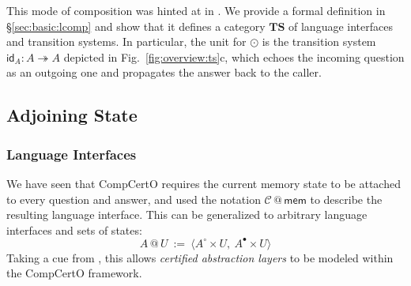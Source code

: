 \documentclass[acmsmall,screen,review,anonymous]{acmart}
\newcommand{\kw}[1]{\ensuremath{ \mathsf{#1} }}
\newcommand{\que}{\circ}
\newcommand{\ans}{\bullet}
\begin{document}
This mode of composition was hinted at in \citet{compcerto}.
We provide a formal definition in \S\ref{sec:basic:lcomp}
and show that
it defines a category $\mathbf{TS}$ of
language interfaces and transition systems.
In particular,
the unit for $\odot$ is
the transition system $\kw{id}_A : A \twoheadrightarrow A$
depicted in Fig.~\ref{fig:overview:ts}c,
which echoes the incoming question as an outgoing one
and propagates the answer back to the caller.



\subsection{Adjoining State} \label{sec:overview:slift} %

\subsubsection{Language Interfaces} %

We have seen that CompCertO
requires the current memory state to be attached
to every question and answer,
and used the notation $\mathcal{C} \mathbin@ \kw{mem}$
to describe the resulting language interface.
This can be generalized to arbitrary
language interfaces and sets of states:
\[
  A \mathbin@ U \: := \:
    \langle A^\que \times U, \: A^\ans \times U \rangle
\]
Taking a cue from \citep{rbgs-cal},
this allows \emph{certified abstraction layers} to be modeled
within the CompCertO framework.

\end{document}
